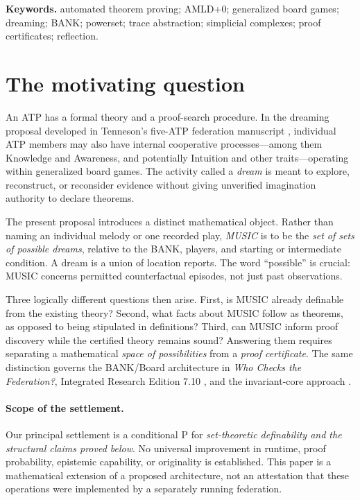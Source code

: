 \documentclass[11pt,letterpaper]{article}
\theoremstyle{definition}
\theoremstyle{remark}
\newcommand{\status}[1]{\textsf{#1}}
\begin{document}
\noindent\textbf{Keywords.} automated theorem proving; AMLD+0; generalized board games; dreaming; BANK; powerset; trace abstraction; simplicial complexes; proof certificates; reflection.

\tableofcontents
\vspace{6pt}
\section{The motivating question}
An ATP has a formal theory and a proof-search procedure. In the dreaming proposal developed in Tenneson's five-ATP federation manuscript \cite{tenneson-dreaming}, individual ATP members may also have internal cooperative processes---among them Knowledge and Awareness, and potentially Intuition and other traits---operating within generalized board games. The activity called a \emph{dream} is meant to explore, reconstruct, or reconsider evidence without giving unverified imagination authority to declare theorems.

The present proposal introduces a distinct mathematical object. Rather than naming an individual melody or one recorded play, \emph{MUSIC} is to be the \emph{set of sets of possible dreams}, relative to the BANK, players, and starting or intermediate condition. A dream is a union of location reports. The word ``possible'' is crucial: MUSIC concerns permitted counterfactual episodes, not just past observations.

Three logically different questions then arise. First, is MUSIC already definable from the existing theory? Second, what facts about MUSIC follow as theorems, as opposed to being stipulated in definitions? Third, can MUSIC inform proof discovery while the certified theory remains sound? Answering them requires separating a mathematical \emph{space of possibilities} from a \emph{proof certificate}. The same distinction governs the BANK/Board architecture in \emph{Who Checks the Federation?}, Integrated Research Edition 7.10 \cite{tenneson-wcf}, and the invariant-core approach \cite{tenneson-core}.

\paragraph{Scope of the settlement.} Our principal settlement is a conditional \status{P} for \emph{set-theoretic definability and the structural claims proved below}. No universal improvement in runtime, proof probability, epistemic capability, or originality is established. This paper is a mathematical extension of a proposed architecture, not an attestation that these operations were implemented by a separately running federation.
\end{document}
